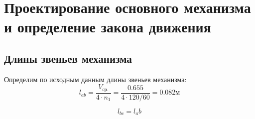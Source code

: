 \section{Проектирование основного механизма и определение закона движения}
\subsection{Длины звеньев механизма}
Определим по исходным данным длины звеньев механизма:
\begin{equation}
	l_{ab} = \frac{V_\text{ср.}}{4 \cdot n_1} = \frac{0.655}{4 \cdot 120 / 60} = 0.082 \text{м}
\end{equation}

\begin{equation}
l_{bc} = l_ab 
\end{equation}